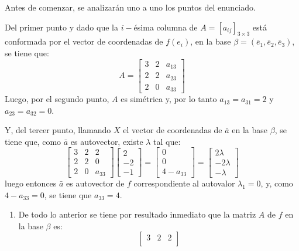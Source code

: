 \begin{solucion}
 Antes de comenzar, se analizar\'an uno a uno los puntos del enunciado.
 \par 
 Del primer punto y dado que la $i-$\'esima columna de $A=[a_{ij}]_{3\times 3}$ est\'a conformada por el vector de coordenadas de $f(e_i)$, en la base $\beta = (\bar{e}_1, \bar{e}_2, \bar{e}_3)$, se tiene que:
 \begin{equation*}
  A =
  \begin{bmatrix}
   3 & 2 & a_{13} \\
   2 & 2 & a_{23} \\
   2 & 0 & a_{33}
  \end{bmatrix}
 \end{equation*}
 Luego, por el segundo punto, $A$ es sim\'etrica y, por lo tanto $a_{13} = a_{31} = 2$ y $a_{23} = a_{32} = 0$.
 \par 
 Y, del tercer punto, llamando $X$ el vector de coordenadas de $\bar{a}$ en la base $\beta$, se tiene que, como $\bar{a}$ es autovector, existe $\lambda$ tal que:
 \begin{equation*}
  \begin{bmatrix}
   3 & 2 & 2 \\
   2 & 2 & 0 \\
   2 & 0 & a_{33}
  \end{bmatrix}
  \begin{bmatrix}
   2 \\ -2 \\ -1
  \end{bmatrix}
  = 
  \begin{bmatrix}
   0 \\ 0 \\ 4 - a_{33}
  \end{bmatrix}
  = 
  \begin{bmatrix}
   2\lambda \\ -2\lambda \\ -\lambda
  \end{bmatrix}
 \end{equation*}
 luego entonces $\bar{a}$ es autovector de $f$ correspondiente al autovalor $\lambda_1 = 0$, y, como $4-a_{33} = 0$, se tiene que $a_{33} = 4$.
 \begin{enumerate}[$a$)]
  \item De todo lo anterior se tiene por resultado inmediato que la matriz $A$ de $f$ en la base $\beta$ es:
  \begin{equation*}
   \begin{bmatrix}
    3 & 2 & 2 \\

\end{bmatrix}
\end{equation*}
\end{enumerate}
\end{solucion}
